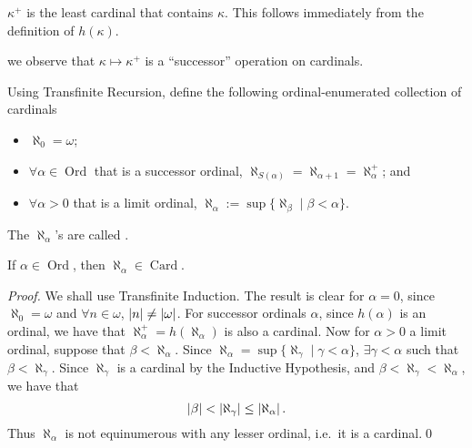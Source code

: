 \documentclass[notoc,notitlepage]{tufte-book}
\DeclareMathOperator{\Ord}{Ord }
\DeclareMathOperator{\Card}{Card }
\begin{document}
\begin{remark}
  $\kappa^+$ is the least cardinal that contains $\kappa$. This follows immediately from the definition of $h(\kappa)$.
\end{remark}

 we observe that $\kappa \mapsto \kappa^+$ is a ``successor'' operation on cardinals.

\begin{defn}\label{defn:cardinal_numbers}
  Using Transfinite Recursion, define the following ordinal-enumerated collection of cardinals
  \begin{itemize}
    \item $\aleph_0 = \omega$;
    \item $\forall \alpha \in \Ord$ that is a successor ordinal, $\aleph_{S(\alpha)} = \aleph_{\alpha + 1} = \aleph_\alpha^+$; and
    \item $\forall \alpha > 0$ that is a limit ordinal, $\aleph_\alpha := \sup \{ \aleph_\beta\mid \beta < \alpha \}$.
  \end{itemize}
  The $\aleph_\alpha$'s are called .
\end{defn}

\begin{lemma}\label{lemma:cardinal_numbers_are_cardinals}
  If $\alpha \in \Ord$, then $\aleph_\alpha \in \Card$.
\end{lemma}

\begin{proof}
  We shall use Transfinite Induction. The result is clear for $\alpha = 0$, since $\aleph_0 = \omega$ and $\forall n \in \omega$, $\left|n\right| \neq \left|\omega\right|$. For successor ordinals $\alpha$, since $h(\alpha)$ is an ordinal, we have that $\aleph_\alpha^+ = h(\aleph_\alpha)$ is also a cardinal. Now for $\alpha > 0$ a limit ordinal, suppose that $\beta < \aleph_\alpha$. Since $\aleph_\alpha = \sup \{ \aleph_\gamma \mid \gamma < \alpha \}$, $\exists \gamma < \alpha$ such that $\beta < \aleph_\gamma$. Since $\aleph_\gamma$ is a cardinal by the Inductive Hypothesis, and $\beta < \aleph_\gamma < \aleph_\alpha$, we have that
  \begin{equation*}
    \left|\beta\right| < \left|\aleph_\gamma\right| \leq \left|\aleph_\alpha\right|.
  \end{equation*}
  Thus $\aleph_\alpha$ is not equinumerous with any lesser ordinal, i.e.\ it is a cardinal.\qed\
\end{proof}
\end{document}
